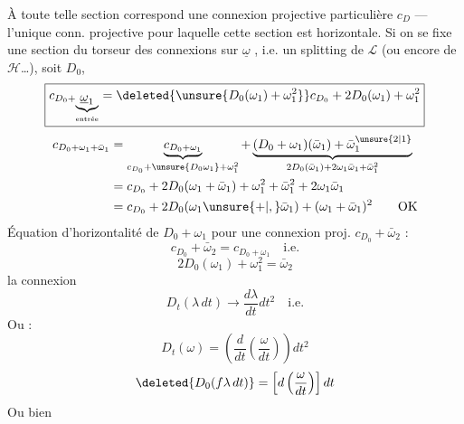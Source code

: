 À toute telle section correspond une connexion projective particulière $c_D$ --- l'unique conn. projective pour laquelle cette section est horizontale.
Si on se fixe une section du  torseur des connexions sur $\underline\omega$ , i.e. un splitting de $\mathcal L$ (ou encore de $\mathcal H$\ldots), soit $D_0$, 
\[
\boxed{c_{D_0+\underbrace{\underline\omega_1}_{\text{entrée}}}=\deleted{\unsure{D_0(\omega_1)+\omega_1^2}}c_{D_0}+2D_0(\omega_1)+\omega_1^2}
\]
\[
\begin{aligned}
c_{D_0+\omega_1+\bar\omega_1}
&=\underbrace{c_{D_0+\omega_1}}_{c_{D_0}+\unsure{D_0\omega_1}+\omega_1^2}
+\underbrace{(D_0+\omega_1)(\bar\omega_1)+\bar\omega_1^{\unsure{2|1}}}_{2D_0(\bar\omega_1)+2\omega_1\bar\omega_1+\bar\omega_1^2}\\
&=c_{D_0}+2D_0(\omega_1+\bar\omega_1)+\omega_1^2+\bar\omega_1^2+2\omega_1\bar\omega_1\\
&=c_{D_0}+2D_0(\omega_1\unsure{+|,}\bar\omega_1)+(\omega_1+\bar\omega_1)^2\qquad\text{OK}
\end{aligned}
\]
Équation d'horizontalité de $D_0+\omega_1$ pour une connexion proj. $c_{D_0}+\bar\omega_2$ :
\[
c_{D_0}+\bar\omega_2=c_{D_0+\omega_1}\quad\text{i.e.}
\]
\[
\boxed{2D_0(\omega_1)+\omega_1^2=\bar\omega_2}
\]
 la connexion
\[
D_t(\lambda\,dt)\longrightarrow\frac{d\lambda}{dt}dt^2\quad\text{i.e.}
\]
Ou :
\[
D_t(\omega)=\left(\frac d{dt}\left(\frac\omega{dt}\right)\right)dt^2
\]
\[
\deleted{D_0(f\lambda\,dt)}=\left[d\left(\frac\omega{dt}\right)\right]dt
\]
Ou bien

